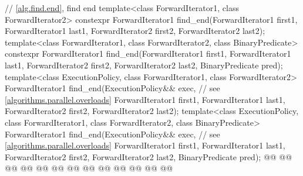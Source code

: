 \begin{codeblock}
{  // \ref{alg.find.end}, find end
  template<class ForwardIterator1, class ForwardIterator2>
    constexpr ForwardIterator1
      find_end(ForwardIterator1 first1, ForwardIterator1 last1,
               ForwardIterator2 first2, ForwardIterator2 last2);
  template<class ForwardIterator1, class ForwardIterator2, class BinaryPredicate>
    constexpr ForwardIterator1
      find_end(ForwardIterator1 first1, ForwardIterator1 last1,
               ForwardIterator2 first2, ForwardIterator2 last2,
               BinaryPredicate pred);
  template<class ExecutionPolicy, class ForwardIterator1, class ForwardIterator2>
    ForwardIterator1
      find_end(ExecutionPolicy&& exec, // see \ref{algorithms.parallel.overloads}
               ForwardIterator1 first1, ForwardIterator1 last1,
               ForwardIterator2 first2, ForwardIterator2 last2);
  template<class ExecutionPolicy, class ForwardIterator1,
           class ForwardIterator2, class BinaryPredicate>
    ForwardIterator1
      find_end(ExecutionPolicy&& exec, // see \ref{algorithms.parallel.overloads}
               ForwardIterator1 first1, ForwardIterator1 last1,
               ForwardIterator2 first2, ForwardIterator2 last2,
               BinaryPredicate pred);
  @@
    @@
        @@
        @@
      @@
        @@
                @@
    @@
        @@
          @@
      @@
        @@
  @\added{\}}@

}
\end{codeblock}
